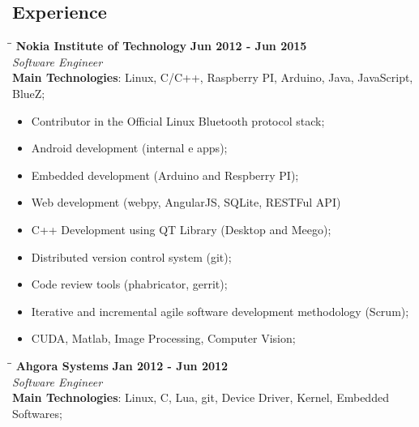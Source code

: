 \documentclass[margin]{eder}
\begin{document}
\begin{resume}
\section{Experience}

\vspace{-0.1in}
  \begin{tabbing}
    \hspace{2.3in}\= \hspace{1.7in}\= \kill
    \textbf{Nokia Institute of Technology}    \>\>\textbf{Jun 2012 - Jun 2015}\\
    \textit{Software Engineer}\\
    \textbf{Main Technologies}: Linux, C/C++, Raspberry PI, Arduino, Java, JavaScript, BlueZ;
  \end{tabbing}\vspace{-20pt} 
\vspace{6mm}

\begin{itemize}
  \item Contributor in the Official Linux Bluetooth protocol stack;
  \item Android development (internal e apps);
  \item Embedded development (Arduino and Respberry PI);
  \item Web development (webpy, AngularJS, SQLite, RESTFul API)
  \item C++ Development using QT Library (Desktop and Meego);
  \item Distributed version control system (git);
  \item Code review tools (phabricator, gerrit);
  \item Iterative and incremental agile software development methodology (Scrum);
  \item CUDA, Matlab, Image Processing, Computer Vision;
\end{itemize}

\vspace{-0.1in}
  \begin{tabbing}
    \hspace{2.3in}\= \hspace{1.7in}\= \kill
    \textbf{Ahgora Systems}    \>\>\textbf{Jan 2012 - Jun 2012}\\
    \textit{Software Engineer}\\        
    \textbf{Main Technologies}: Linux, C, Lua, git, Device Driver, Kernel, Embedded Softwares;
  \end{tabbing}\vspace{-20pt} 
\vspace{6mm}


\end{resume}
\end{document}
